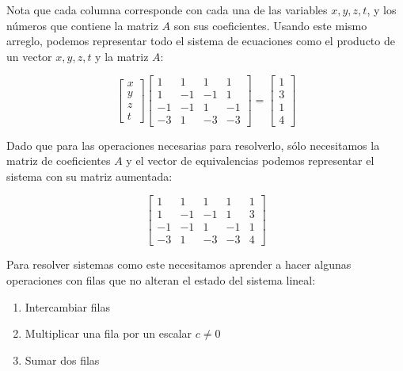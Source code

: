 \documentclass[
]{book}
\providecommand{\tightlist}{%
  \setlength{\itemsep}{0pt}\setlength{\parskip}{0pt}}
\begin{document}
Nota que cada columna corresponde con cada una de las variables \(x, y, z, t\), y los números que contiene la matriz \(A\) son sus coeficientes. Usando este mismo arreglo, podemos representar todo el sistema de ecuaciones como el producto de un vector \(x, y, z, t\) y la matriz \(A\):

\begin{equation}
\left[
\begin{array} {r}
x \\ y \\ z \\ t
\end{array}
\right]
\left[
\begin{array}{rrrr}
1 & 1 & 1 & 1 \\
1 &-1 &-1 & 1 \\
-1&-1 & 1 &-1 \\
-3& 1 &-3 &-3
\end{array} 
\right] = 
\left[\begin{array}{r}
1 \\ 3 \\ 1 \\ 4
\end{array}\right] \label{eq:sist-matriz}
\end{equation}

Dado que para las operaciones necesarias para resolverlo, sólo necesitamos la matriz de coeficientes \(A\) y el vector de equivalencias podemos representar el sistema con su matriz aumentada:

\begin{equation}
\left[
\begin{array}{rrrr|l}
1 & 1 & 1 & 1 & 1\\
1 &-1 &-1 & 1 & 3\\
-1&-1 & 1 &-1 & 1\\
-3& 1 &-3 &-3 & 4
\end{array} \right] \label{eq:Aumentada}
\end{equation}

Para resolver sistemas como este necesitamos aprender a hacer algunas operaciones con filas que no alteran el estado del sistema lineal:

\begin{enumerate}
\def\labelenumi{\arabic{enumi}.}
\tightlist
\item
  Intercambiar filas
\item
  Multiplicar una fila por un escalar \(c \neq 0\)
\item
  Sumar dos filas
\end{enumerate}
\end{document}
